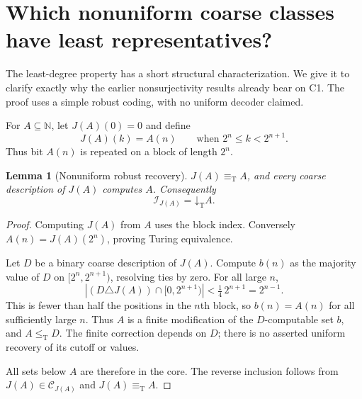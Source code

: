 \documentclass[11pt,a4paper]{article}
\newcommand{\N}{\mathbb N}
\newcommand{\leT}{\leq_{\mathrm T}}
\newcommand{\eqT}{\equiv_{\mathrm T}}
\newcommand{\CD}{\mathcal C}
\newcommand{\core}{\mathcal I}
\newcommand{\low}[1]{\mathord\downarrow_{\!\mathrm T}#1}
\newtheorem{lemma}[theorem]{Lemma}
\theoremstyle{definition}\newtheorem{definition}[theorem]{Definition}
\theoremstyle{remark}\newtheorem{remark}[theorem]{Remark}
\begin{document}
\section{Which nonuniform coarse classes have least representatives?}
\label{sec:classification}
The least-degree property has a short structural characterization. We give
it to clarify exactly why the earlier nonsurjectivity results already bear
on C1. The proof uses a simple robust coding, with no uniform decoder claimed.

For $A\subseteq\N$, let $J(A)(0)=0$ and define
\begin{equation}\label{eq:J}
 J(A)(k)=A(n)\qquad\text{when }2^n\le k<2^{n+1}.
\end{equation}
Thus bit $A(n)$ is repeated on a block of length $2^n$.

\begin{lemma}[Nonuniform robust recovery]\label{lem:J}
$J(A)\eqT A$, and every coarse description of $J(A)$ computes $A$.
Consequently
\[
 \core_{J(A)}=\low A.
\]
\end{lemma}
\begin{proof}
Computing $J(A)$ from $A$ uses the block index. Conversely
$A(n)=J(A)(2^n)$, proving Turing equivalence.

Let $D$ be a binary coarse description of $J(A)$. Compute $b(n)$ as the
majority value of $D$ on $[2^n,2^{n+1})$, resolving ties by zero. For all large
$n$,
\[
 |(D\triangle J(A))\cap[0,2^{n+1})|
       <\tfrac14\,2^{n+1}=2^{n-1}.
\]
This is fewer than half the positions in the $n$th block, so $b(n)=A(n)$ for
all sufficiently large $n$. Thus $A$ is a finite modification of the
$D$-computable set $b$, and $A\leT D$. The finite correction depends on $D$;
there is no asserted uniform recovery of its cutoff or values.

All sets below $A$ are therefore in the core. The reverse inclusion follows
from $J(A)\in\CD_{J(A)}$ and $J(A)\eqT A$.
\end{proof}
\end{document}
